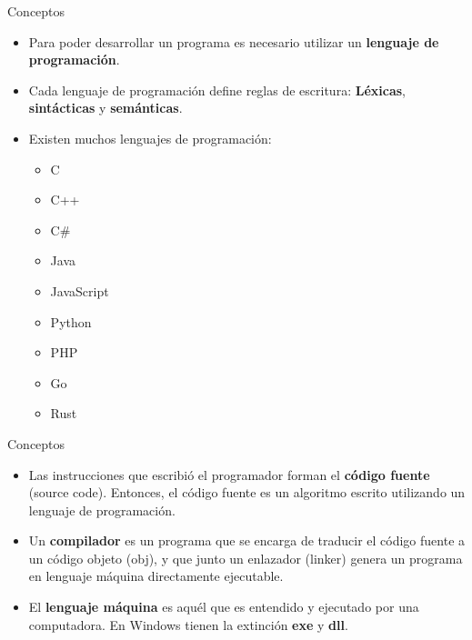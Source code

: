 \begin{frame}[c]{Conceptos}
  \begin{itemize}
    \item Para poder desarrollar un programa es necesario utilizar un
      \textbf{lenguaje de programación}.
    \pausa
    \item Cada lenguaje de programación define reglas de escritura:
      \textbf{Léxicas}, \textbf{sintácticas} y \textbf{semánticas}.
    \pausa
    \item Existen muchos lenguajes de programación:
      \begin{multicols}{3}
        \begin{itemize}
          \item C
          \pausa
          \item C++
          \pausa
          \item C\#
          \pausa
          \item Java
          \pausa
          \item JavaScript
          \pausa
          \item Python
          \pausa
          \item PHP
          \pausa
          \item Go
          \pausa
          \item Rust
        \end{itemize}
      \end{multicols}
  \end{itemize}
\end{frame}

\begin{frame}[c]{Conceptos}
  \begin{itemize}
    \item Las instrucciones que escribió el programador forman el
      \textbf{código fuente} (source code). Entonces, el código fuente es un
      algoritmo escrito utilizando un lenguaje de programación.

    \item Un \textbf{compilador} es un programa que se encarga de traducir
      el código fuente a un código objeto (obj), y que junto un enlazador
      (linker) genera un programa en lenguaje máquina directamente ejecutable.

    \item El \textbf{lenguaje máquina} es aquél que es entendido y ejecutado
      por una computadora. En Windows tienen la extinción \textbf{exe} y
      \textbf{dll}.

  \end{itemize}
\end{frame}
